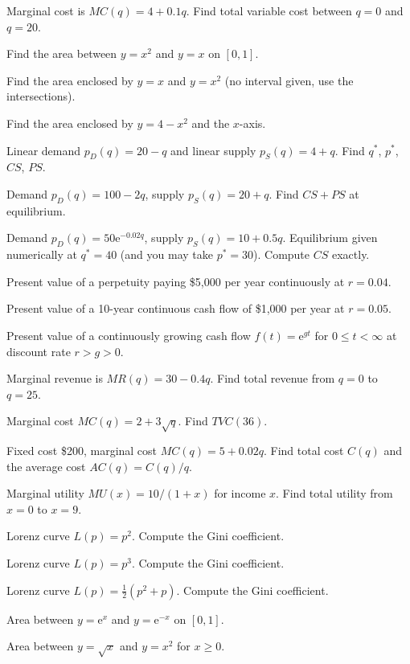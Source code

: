 \begin{problems}
  \item Marginal cost is $MC(q)=4+0.1q$. Find total variable cost
        between $q=0$ and $q=20$.
  \item Find the area between $y=x^{2}$ and $y=x$ on $[0,1]$.
  \item Find the area enclosed by $y=x$ and $y=x^{2}$ (no interval
        given, use the intersections).
  \item Find the area enclosed by $y=4-x^{2}$ and the $x$-axis.
  \item Linear demand $p_D(q)=20-q$ and linear supply $p_S(q)=4+q$.
        Find $q^{*}$, $p^{*}$, $CS$, $PS$.
  \item Demand $p_D(q)=100-2q$, supply $p_S(q)=20+q$. Find $CS+PS$ at
        equilibrium.
  \item Demand $p_D(q)=50\mathrm{e}^{-0.02q}$, supply $p_S(q)=10+0.5q$.
        Equilibrium given numerically at $q^{*}=40$ (and you may take
        $p^{*}=30$). Compute $CS$ exactly.
  \item Present value of a perpetuity paying \$5,000 per year
        continuously at $r=0.04$.
  \item Present value of a 10-year continuous cash flow of \$1,000 per
        year at $r=0.05$.
  \item Present value of a continuously growing cash flow
        $f(t)=\mathrm{e}^{gt}$ for $0\le t<\infty$ at discount rate
        $r>g>0$.
  \item Marginal revenue is $MR(q)=30-0.4q$. Find total revenue from
        $q=0$ to $q=25$.
  \item Marginal cost $MC(q)=2+3\sqrt{q}$. Find $TVC(36)$.
  \item Fixed cost \$200, marginal cost $MC(q)=5+0.02q$. Find total cost
        $C(q)$ and the average cost $AC(q)=C(q)/q$.
  \item Marginal utility $MU(x)=10/(1+x)$ for income $x$. Find total
        utility from $x=0$ to $x=9$.
  \item Lorenz curve $L(p)=p^{2}$. Compute the Gini coefficient.
  \item Lorenz curve $L(p)=p^{3}$. Compute the Gini coefficient.
  \item Lorenz curve $L(p)=\frac{1}{2}(p^{2}+p)$. Compute the Gini
        coefficient.
  \item Area between $y=\mathrm{e}^{x}$ and $y=\mathrm{e}^{-x}$ on
        $[0,1]$.
  \item Area between $y=\sqrt{x}$ and $y=x^{2}$ for $x\ge 0$.

\end{problems}
